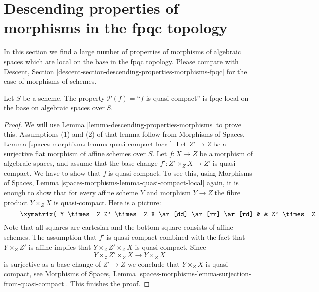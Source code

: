 \section{Descending properties of morphisms in the fpqc topology}
\label{section-descending-properties-morphisms-fpqc}


\noindent
In this section we find a large number of properties
of morphisms of algebraic spaces which are local on the base
in the fpqc topology. Please compare with
Descent, Section \ref{descent-section-descending-properties-morphisms-fpqc}
for the case of morphisms of schemes.

\begin{lemma}
\label{lemma-descending-property-quasi-compact}
Let $S$ be a scheme.
The property $\mathcal{P}(f) =$``$f$ is quasi-compact''
is fpqc local on the base on algebraic spaces over $S$.
\end{lemma}

\begin{proof}
We will use
Lemma \ref{lemma-descending-properties-morphisms}
to prove this. Assumptions (1) and (2) of that lemma follow from
Morphisms of Spaces,
Lemma \ref{spaces-morphisms-lemma-quasi-compact-local}.
Let $Z' \to Z$ be a surjective flat morphism of affine schemes over $S$.
Let $f : X \to Z$ be a morphism of algebraic spaces, and assume
that the base change $f' : Z' \times_Z X \to Z'$ is quasi-compact. We have
to show that $f$ is quasi-compact. To see this, using
Morphisms of Spaces,
Lemma \ref{spaces-morphisms-lemma-quasi-compact-local}
again, it is enough to show that for every affine scheme $Y$ and
morphism $Y \to Z$ the fibre product $Y \times_Z X$ is quasi-compact.
Here is a picture:
\begin{equation}
\label{equation-cube}
\vcenter{
\xymatrix{
Y \times_Z Z' \times_Z X \ar[dd] \ar[rr] \ar[rd] & &
Z' \times_Z X \ar'[d][dd]^{f'} \ar[rd] \\
& Y \times_Z X \ar[dd] \ar[rr] & & X \ar[dd]^f \\
Y \times_Z Z' \ar'[r][rr] \ar[rd] & & Z' \ar[rd] \\
& Y \ar[rr] & & Z
}
}
\end{equation}
Note that all squares are cartesian and the bottom square consists
of affine schemes. The assumption that $f'$ is quasi-compact combined with
the fact that $Y \times_Z Z'$ is affine implies that
$Y \times_Z Z' \times_Z X$ is quasi-compact. Since
$$
Y \times_Z Z' \times_Z X \longrightarrow Y \times_Z X
$$
is surjective as a base change of $Z' \to Z$
we conclude that $Y \times_Z X$ is quasi-compact, see
Morphisms of Spaces,
Lemma \ref{spaces-morphisms-lemma-surjection-from-quasi-compact}.
This finishes the proof.
\end{proof}

